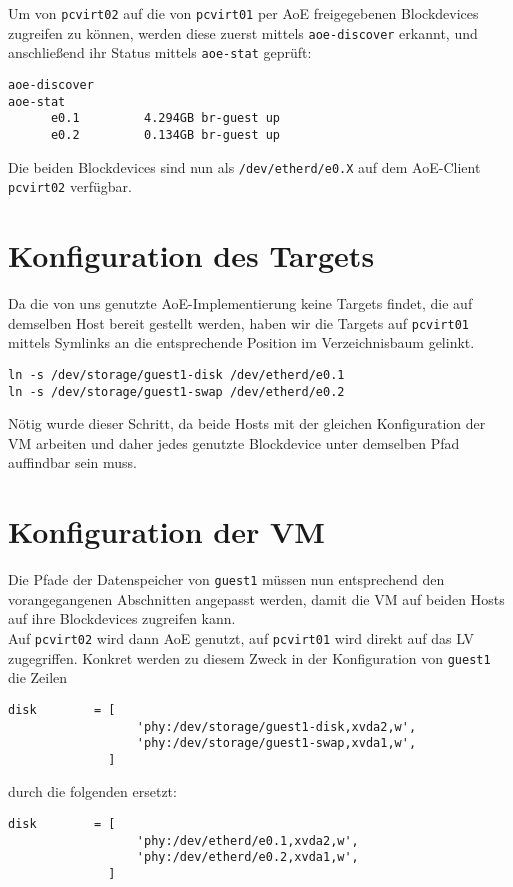Um von \verb#pcvirt02# auf die von \verb#pcvirt01# per AoE freigegebenen Blockdevices zugreifen zu können, werden diese zuerst mittels \verb#aoe-discover# erkannt, und anschließend ihr Status mittels \verb#aoe-stat# geprüft:
\setupVerbatimOut
\begin{verbatim}
aoe-discover 
aoe-stat 
      e0.1         4.294GB br-guest up 
      e0.2         0.134GB br-guest up  
\end{verbatim}

Die beiden Blockdevices sind nun als \verb#/dev/etherd/e0.X# auf dem AoE-Client \verb#pcvirt02# verfügbar.

\section{Konfiguration des Targets}\label{dirtysym}
Da die von uns genutzte AoE-Implementierung keine Targets findet, die auf demselben Host bereit gestellt werden, haben wir die Targets auf \verb#pcvirt01# mittels Symlinks an die entsprechende Position im Verzeichnisbaum gelinkt.
\setupVerbatimOut
\begin{verbatim}
ln -s /dev/storage/guest1-disk /dev/etherd/e0.1
ln -s /dev/storage/guest1-swap /dev/etherd/e0.2 
\end{verbatim}

Nötig wurde dieser Schritt, da beide Hosts mit der gleichen Konfiguration der VM arbeiten und daher jedes genutzte Blockdevice unter demselben Pfad auffindbar sein muss.

\section{Konfiguration der VM}
Die Pfade der Datenspeicher von \verb#guest1# müssen nun entsprechend den vorangegangenen Abschnitten angepasst werden, damit die VM auf beiden Hosts auf ihre Blockdevices zugreifen kann.
\\
Auf \verb#pcvirt02# wird dann AoE genutzt, auf \verb#pcvirt01# wird direkt auf das LV zugegriffen. Konkret werden zu diesem Zweck in der Konfiguration von \verb#guest1# die Zeilen
\setupVerbatimOut
\begin{verbatim}
disk        = [
                  'phy:/dev/storage/guest1-disk,xvda2,w',
                  'phy:/dev/storage/guest1-swap,xvda1,w',
              ]
\end{verbatim}
durch die folgenden ersetzt:
\setupVerbatimOut
\begin{verbatim}
disk        = [
                  'phy:/dev/etherd/e0.1,xvda2,w',
                  'phy:/dev/etherd/e0.2,xvda1,w',
              ]
\end{verbatim}

